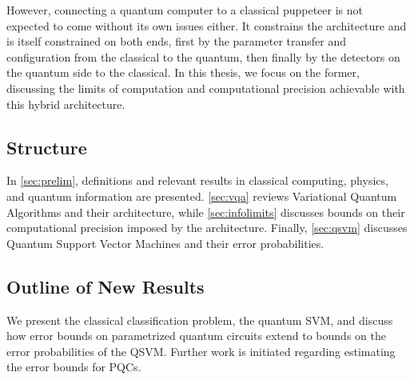 However, connecting a quantum computer to a classical puppeteer is not expected
to come without its own issues either. It constrains the architecture and is
itself constrained on both ends, first by the parameter transfer and
configuration from the classical to the quantum, then finally by the detectors
on the quantum side to the classical. In this thesis, we focus on the former,
discussing the limits of computation and computational precision achievable with
this hybrid architecture.

\subsection{Structure}
In \autoref{sec:prelim}, definitions and relevant results in classical
computing, physics, and quantum information are presented.  \autoref{sec:vqa}
reviews Variational Quantum Algorithms and their architecture, while
\autoref{sec:infolimits} discusses bounds on their computational precision
imposed by the architecture. Finally, \autoref{sec:qsvm} discusses Quantum
Support Vector Machines and their error probabilities.

\subsection{Outline of New Results}
We present the classical classification problem, the quantum SVM, and discuss
how error bounds on parametrized quantum circuits extend to bounds on the error
probabilities of the QSVM. Further work is initiated regarding estimating the
error bounds for PQCs.

